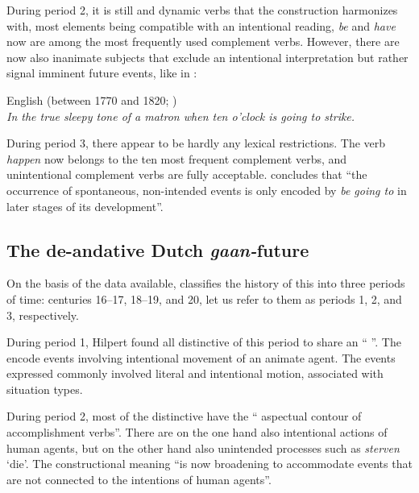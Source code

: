 \documentclass[output=paper]{langsci/langscibook}
\begin{document}
   During period 2, it is still  and dynamic verbs that the construction harmonizes with, most elements being compatible with an intentional reading, \textit{be} and \textit{have} now are among the most frequently used complement verbs. However, there are now also inanimate subjects that exclude an intentional interpretation but rather signal imminent future events, like in :



\ea%
    \label{ex:heine:11}
         English (between 1770 and 1820; \citealt[120]{Hilpert2008})\\
    \textit{In the true sleepy tone of a  matron when ten o’clock is going to strike.}
\z


During period 3, there appear to be hardly any lexical restrictions. The verb \textit{happen} now belongs to the ten most frequent complement verbs, and unintentional complement verbs are fully acceptable. \citet[121]{Hilpert2008} concludes that “the occurrence of spontaneous, non-intended events is only encoded by \textit{be going to} in later stages of its development”.   



\subsection{The de-andative Dutch \textit{gaan-}future}\label{sec:heine:3.2}



On the basis of the data available, \citet[113]{Hilpert2008} classifies the history of this  into three periods of time: centuries 16--17, 18--19, and 20, let us refer to them as periods 1, 2, and 3, respectively. 



  During period 1, Hilpert found all distinctive  of this period to share an `` ”. The  encode events involving intentional movement of an animate agent. The events expressed commonly involved literal and intentional motion, associated with  situation types.



  During period 2, most of the distinctive  have the `` aspectual contour of accomplishment verbs”. There are on the one hand also intentional actions of human agents, but on the other hand also unintended processes such as \textit{sterven} ‘die’. The constructional meaning “is now broadening to accommodate events that are not connected to the intentions of human agents”.
\end{document}
